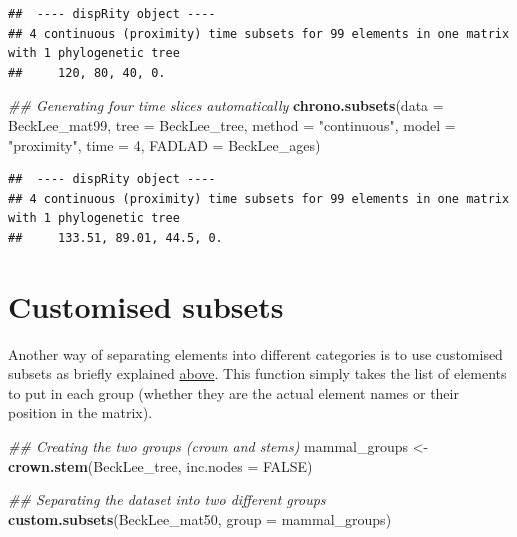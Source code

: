 \documentclass[]{book}
\newenvironment{Shaded}{\begin{snugshade}}{\end{snugshade}}
\newcommand{\CommentTok}[1]{\textcolor[rgb]{0.56,0.35,0.01}{\textit{#1}}}
\newcommand{\DataTypeTok}[1]{\textcolor[rgb]{0.13,0.29,0.53}{#1}}
\newcommand{\DecValTok}[1]{\textcolor[rgb]{0.00,0.00,0.81}{#1}}
\newcommand{\KeywordTok}[1]{\textcolor[rgb]{0.13,0.29,0.53}{\textbf{#1}}}
\newcommand{\NormalTok}[1]{#1}
\newcommand{\OtherTok}[1]{\textcolor[rgb]{0.56,0.35,0.01}{#1}}
\newcommand{\StringTok}[1]{\textcolor[rgb]{0.31,0.60,0.02}{#1}}
\begin{document}
\begin{verbatim}
##  ---- dispRity object ---- 
## 4 continuous (proximity) time subsets for 99 elements in one matrix with 1 phylogenetic tree
##     120, 80, 40, 0.
\end{verbatim}

\begin{Shaded}
\begin{Highlighting}[]
\CommentTok{## Generating four time slices automatically}
\KeywordTok{chrono.subsets}\NormalTok{(}\DataTypeTok{data =}\NormalTok{ BeckLee_mat99, }\DataTypeTok{tree =}\NormalTok{ BeckLee_tree,}
               \DataTypeTok{method =} \StringTok{"continuous"}\NormalTok{, }\DataTypeTok{model =} \StringTok{"proximity"}\NormalTok{,}
               \DataTypeTok{time =} \DecValTok{4}\NormalTok{, }\DataTypeTok{FADLAD =}\NormalTok{ BeckLee_ages)}
\end{Highlighting}
\end{Shaded}

\begin{verbatim}
##  ---- dispRity object ---- 
## 4 continuous (proximity) time subsets for 99 elements in one matrix with 1 phylogenetic tree
##     133.51, 89.01, 44.5, 0.
\end{verbatim}

\hypertarget{custom-subsets}{%
\section{Customised subsets}\label{custom-subsets}}

Another way of separating elements into different categories is to use customised subsets as briefly explained \protect\hyperlink{disparity-among-groups}{above}.
This function simply takes the list of elements to put in each group (whether they are the actual element names or their position in the matrix).

\begin{Shaded}
\begin{Highlighting}[]
\CommentTok{## Creating the two groups (crown and stems)}
\NormalTok{mammal_groups <-}\StringTok{ }\KeywordTok{crown.stem}\NormalTok{(BeckLee_tree, }\DataTypeTok{inc.nodes =} \OtherTok{FALSE}\NormalTok{)}

\CommentTok{## Separating the dataset into two different groups}
\KeywordTok{custom.subsets}\NormalTok{(BeckLee_mat50, }\DataTypeTok{group =}\NormalTok{ mammal_groups)}
\end{Highlighting}
\end{Shaded}
\end{document}
